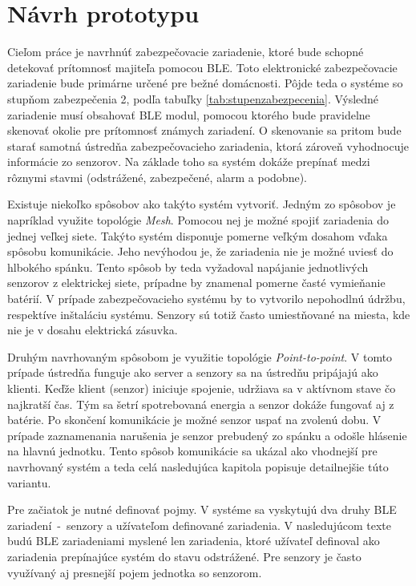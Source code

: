 \chapter{Návrh prototypu}

Cieľom práce je navrhnúť zabezpečovacie zariadenie, ktoré bude schopné detekovať prítomnosť majiteľa pomocou BLE. Toto elektronické zabezpečovacie zariadenie bude primárne určené pre bežné domácnosti. Pôjde teda o systéme so stupňom zabezpečenia 2, podľa tabuľky \ref{tab:stupenzabezpecenia}. Výsledné zariadenie musí obsahovať BLE modul, pomocou ktorého bude pravidelne skenovať okolie pre prítomnosť známych zariadení. O skenovanie sa pritom bude starať samotná ústredňa zabezpečovacieho zariadenia, ktorá zároveň vyhodnocuje informácie zo senzorov. Na základe toho sa systém dokáže prepínať medzi rôznymi stavmi (odstrážené, zabezpečené, alarm a podobne).

Existuje niekoľko spôsobov ako takýto systém vytvoriť. Jedným zo spôsobov je napríklad využite topológie \textit{Mesh}. Pomocou nej je možné spojiť zariadenia do jednej veľkej siete. Takýto systém disponuje pomerne veľkým dosahom vďaka spôsobu komunikácie. Jeho nevýhodou je, že zariadenia nie je možné uviesť do hlbokého spánku. Tento spôsob by teda vyžadoval napájanie jednotlivých senzorov z elektrickej siete, prípadne by znamenal pomerne časté vymieňanie batérií. V prípade zabezpečovacieho systému by to vytvorilo nepohodlnú údržbu, respektíve inštaláciu systému. Senzory sú totiž často umiestňované na miesta, kde nie je v dosahu elektrická zásuvka.

Druhým navrhovaným spôsobom je využitie topológie \textit{Point-to-point}. V tomto prípade ústredňa funguje ako server a senzory sa na ústredňu pripájajú ako klienti. Keďže klient (senzor) iniciuje spojenie, udržiava sa v aktívnom stave čo najkratší čas. Tým sa šetrí spotrebovaná energia a senzor dokáže fungovať aj z batérie. Po skončení komunikácie je možné senzor uspať na zvolenú dobu. V prípade zaznamenania narušenia je senzor prebudený zo spánku a odošle hlásenie na hlavnú jednotku. Tento spôsob komunikácie sa ukázal ako vhodnejší pre navrhovaný systém a teda celá nasledujúca kapitola popisuje detailnejšie túto variantu.

Pre začiatok je nutné definovať pojmy. V systéme sa vyskytujú dva druhy BLE zariadení~-~senzory a užívateľom definované zariadenia. V nasledujúcom texte budú BLE zariadeniami myslené len zariadenia, ktoré užívateľ definoval ako zariadenia prepínajúce systém do stavu odstrážené. Pre senzory je často využívaný aj presnejší pojem jednotka so senzorom.

